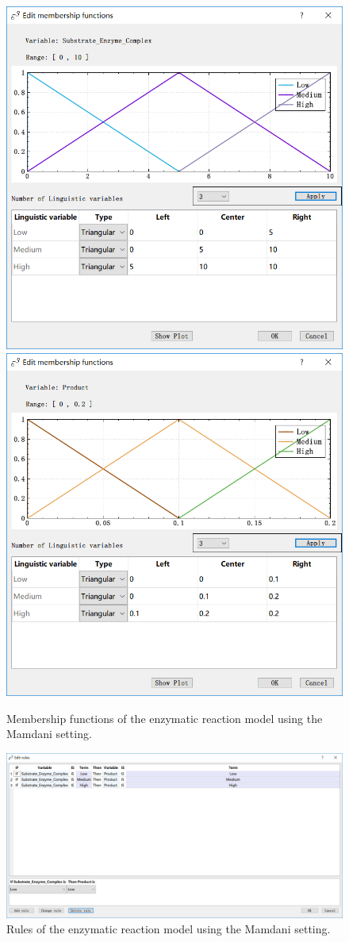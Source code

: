 \documentclass[journal,a4paper,onecolumn]{article}
\begin{document}
\begin{figure}[!hbt]
	\begin{center}
		\includegraphics[width=0.45\columnwidth]{fig41}
		\includegraphics[width=0.45\columnwidth]{fig42}
		\caption{Membership functions of the enzymatic reaction model using the Mamdani setting.}
		\label{fig:Membership functions of enzyme using Mamdani.}
	\end{center}
\end{figure}

\begin{figure}[!hbt]
	\begin{center}
		\includegraphics[width=\columnwidth]{fig43}
		\caption{Rules of the enzymatic reaction model using the Mamdani setting.}
		\label{fig:Rules of enzyme using Mamdani.}
	\end{center}
\end{figure}
\end{document}
